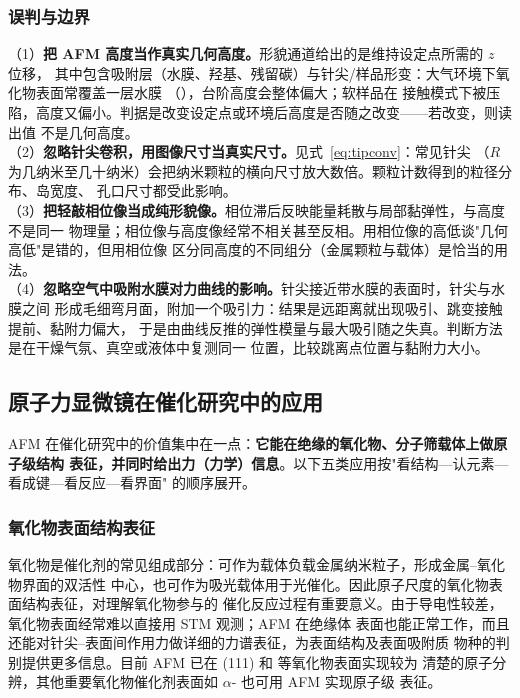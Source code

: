 \subsubsection{误判与边界}
\label{sec:afm-pitfall}

\begin{pitfall}
（1）\textbf{把 AFM 高度当作真实几何高度。}形貌通道给出的是维持设定点所需的 $z$ 位移，
其中包含吸附层（水膜、羟基、残留碳）与针尖/样品形变：大气环境下氧化物表面常覆盖一层水膜
（），台阶高度会整体偏大；软样品在
接触模式下被压陷，高度又偏小。判据是改变设定点或环境后高度是否随之改变——若改变，则读出值
不是几何高度。\\
（2）\textbf{忽略针尖卷积，用图像尺寸当真实尺寸。}见式~\eqref{eq:tipconv}：常见针尖
（$R$ 为几纳米至几十纳米）会把纳米颗粒的横向尺寸放大数倍。颗粒计数得到的粒径分布、岛宽度、
孔口尺寸都受此影响。\\
（3）\textbf{把轻敲相位像当成纯形貌像。}相位滞后反映能量耗散与局部黏弹性，与高度不是同一
物理量；相位像与高度像经常不相关甚至反相。用相位像的高低谈"几何高低"是错的，但用相位像
区分同高度的不同组分（金属颗粒与载体）是恰当的用法。\\
（4）\textbf{忽略空气中吸附水膜对力曲线的影响。}针尖接近带水膜的表面时，针尖与水膜之间
形成毛细弯月面，附加一个吸引力：结果是远距离就出现吸引、跳变接触提前、黏附力偏大，
于是由曲线反推的弹性模量与最大吸引随之失真。判断方法是在干燥气氛、真空或液体中复测同一
位置，比较跳离点位置与黏附力大小。
\end{pitfall}

\subsection{原子力显微镜在催化研究中的应用}
\label{sec:afm-app}

AFM 在催化研究中的价值集中在一点：\textbf{它能在绝缘的氧化物、分子筛载体上做原子级结构
表征，并同时给出力（力学）信息}。以下五类应用按"看结构—认元素—看成键—看反应—看界面"
的顺序展开。

\subsubsection{氧化物表面结构表征}

氧化物是催化剂的常见组成部分：可作为载体负载金属纳米粒子，形成金属--氧化物界面的双活性
中心，也可作为吸光载体用于光催化。因此原子尺度的氧化物表面结构表征，对理解氧化物参与的
催化反应过程有重要意义。由于导电性较差，氧化物表面经常难以直接用 STM 观测；AFM 在绝缘体
表面也能正常工作，而且还能对针尖--表面间作用力做详细的力谱表征，为表面结构及表面吸附质
物种的判别提供更多信息。目前 AFM 已在 (111) 和  等氧化物表面实现较为
清楚的原子分辨，其他重要氧化物催化剂表面如 $\alpha$- 也可用 AFM 实现原子级
表征。

